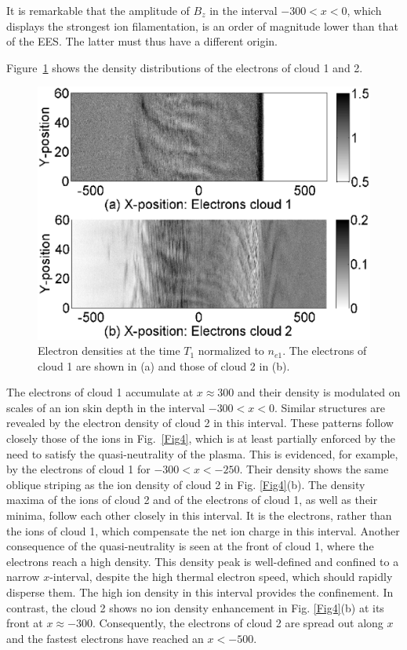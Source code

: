 \documentclass[structabstract]{aa}
\begin{document}
It is remarkable that the amplitude of $B_z$ in the interval $-300 < x < 0$, 
which displays the strongest ion filamentation, is an order of magnitude 
lower than that of the EES. The latter must thus have a different origin.

Figure~\ref{Fig5} shows the density distributions of the electrons of 
cloud 1 and 2.
\begin{figure}
\centering
\includegraphics[width=\columnwidth]{Fig5.eps}
\caption{Electron densities at the time $T_1$ normalized to $n_{e1}$. The  
electrons of cloud 1 are shown in (a) and those of cloud 2 in (b).}
\label{Fig5}
\end{figure}
The electrons of cloud 1 accumulate at $x\approx 300$ and their density
is modulated on scales of an ion skin depth in the interval $-300 < x < 0$. 
Similar structures are revealed by the electron density of cloud 2 in this 
interval. These patterns follow closely those of the ions in Fig.~\ref{Fig4}, 
which is at least partially enforced by the need to satisfy the 
quasi-neutrality of the plasma. This is evidenced, for example, by the 
electrons of cloud 1 for $-300 < x < -250$. Their density shows the same 
oblique striping as the ion density of cloud 2 in Fig. \ref{Fig4}(b). The 
density maxima of the ions of cloud 2 and of the electrons of cloud 1, as 
well as their minima, follow each other closely in this interval. It is the 
electrons, rather than the ions of cloud 1, which compensate the net 
ion charge in this interval. Another consequence of the quasi-neutrality 
is seen at the front of cloud 1, where the electrons reach a high density. 
This density peak is well-defined and confined to a narrow $x$-interval, 
despite the high thermal electron speed, which should rapidly disperse them. 
The high ion density in this interval provides the confinement. In contrast, 
the cloud 2 shows no ion density enhancement in Fig. \ref{Fig4}(b) at its 
front at $x\approx -300$. Consequently, the electrons of cloud 2 are spread 
out along $x$ and the fastest electrons have reached an $x < -500$. 
\end{document}
